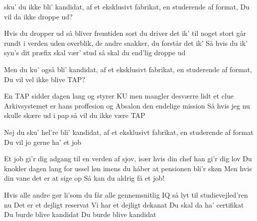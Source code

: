 \documentclass[a4paper,11pt]{article}
\begin{document}
\begin{song}
               sku' du ikke bli' kandidat,
               af et eksklusivt fabrikat,
               en studerende af format,
               Du vil da ikke droppe ud?

               Hvis du dropper ud så bliver fremtiden sort
               du driver det ik' til noget stort
               går rundt i verden uden overblik,
               de andre snakker, du forstår det ik'
               Så hvis du ik' syn's dit præfix skal vær' stud
               så skal du end'lig droppe ud

               Men du ku' også bli' kandidat,
               af et eksklusivt fabrikat,
               en studerende af format,
               Du vil vel ikke blive TAP?

               En TAP sidder dagen lang og styrer KU
               men mangler desværre lidt et clue
               Arkivsystemet er hans proffesion
               og Absalon den endelige mission
               Så hvis jeg nu skulle skære ud i pap
               så vil du ikke være TAP

               Nej du sku' hel're bli' kandidat,
               af et eksklusivt fabrikat,
               en studerende af format
               Du vil jo gerne ha' et job

               Et job gi'r dig adgang til en verden af sjov,
               især hvis din chef han gi'r dig lov
               Du knokler dagen lang for ussel løn
               imens du håber at pensionen bli'r skøn
               Men hvis din vane det er at sige op
               Så kan du aldrig få et job!

               Hvis alle andre gør li'som du
               får alle gennemsnitlig IQ
               så lyt til studievejled'ren nu
               Det er et dejligt reservat
               Vi har et dejligt dekanat
               Du skal da ha' certifikat
               Du burde blive kandidat
               Du burde blive kandidat

\end{song}
\end{document}
